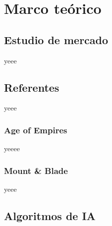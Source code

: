 \chapter{Marco teórico}
\label{Marco_teorico}

\section{Estudio de mercado}
yeee

\section{Referentes}
yeee

  \subsection{Age of Empires}
  yeeee

  \subsection{Mount \& Blade}
  yeee

\section{Algoritmos de IA}


